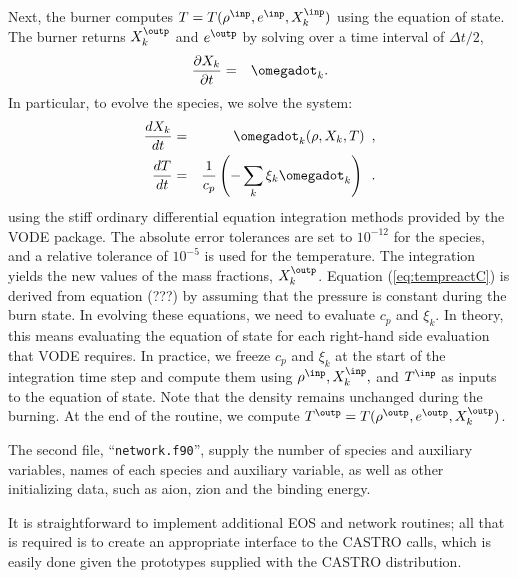 Next, the burner computes $T = T(\rho^\inp,e^\inp,X_k^\inp)$ using the equation of state.
The burner returns $X_k^\outp$ and $e^\outp$ by solving over a time interval of $\Delta t/2$,
\begin{eqnarray}
\frac{\partial X_k}{\partial t} &=& \omegadot_k.\\
\end{eqnarray}
In particular, to evolve the species, we solve the system:
\begin{eqnarray}
\frac{dX_k}{dt} &=& \omegadot_k(\rho,X_k,T)\enskip, \label{eq:VODE1C} \\
\frac{dT}{dt} &=&\frac{1}{c_p} \left ( -\sum_k \xi_k  \omegadot_k  \right )\enskip. \label{eq:tempreactC}
\end{eqnarray}
using the stiff ordinary differential equation integration methods provided by 
the VODE package.  The absolute error tolerances are set to 
$10^{-12}$ for the species, and a relative tolerance of $10^{-5}$ is used for 
the temperature.  The integration yields the new values of the mass fractions, 
$X_k^\outp$.  Equation (\ref{eq:tempreactC}) is derived from equation (???) by 
assuming that the pressure is constant during the burn state.  In evolving these 
equations, we need to evaluate $c_p$ and $\xi_k$.  In theory, this means 
evaluating the equation of state for each right-hand side evaluation that 
VODE requires.  In practice, we freeze $c_p$ and $\xi_k$ at the start of 
the integration time step and compute them using $\rho^\inp, X_k^\inp,$ and $T^\inp$ 
as inputs to the equation of state.  Note that the density remains unchanged during 
the burning.  At the end of the routine, we compute 
$T^\outp = T(\rho^\outp,e^{\outp},X_k^\outp)$.

The second file, ``{\tt network.f90}'', supply the
number of species and auxiliary variables, names of each species and 
auxiliary variable, as well as other initializing data, such as
aion, zion and the binding energy.

It is straightforward to implement additional EOS and network routines; all that is required
is to create an appropriate interface to the CASTRO calls, which is easily done given
the prototypes supplied with the CASTRO distribution.
